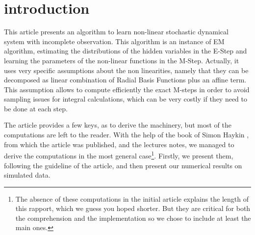 \section*{introduction}
This article \cite{article} presents an algorithm to learn non-linear stochastic dynamical system with incomplete observation. This algorithm is an instance of EM algorithm, estimating the distributions of the hidden variables in the E-Step and learning the parameters of the non-linear functions in the M-Step. Actually, it uses very specific assumptions about the non linearities, namely that they can be decomposed as linear combination of Radial Basis Functions plus an affine term. This assumption allows to compute efficiently the exact M-steps in order to avoid sampling issues for integral calculations, which can be very costly if they need to be done at each step.

The article provides a few keys, as to derive the machinery, but most of the computations are left to the reader. With the help of the book of Simon Haykin \cite{SimonHaykin}, from which the article was published,  and the lectures notes, we managed to derive the computations in the most general case\footnote{The absence of these computations in the initial article explains the length of this rapport, which we guess you hoped shorter. But they are critical for both the comprehension and the implementation so we chose to include at least the main ones.}. Firstly, we present them, following the guideline of the article, and then present our numerical results on simulated data.
